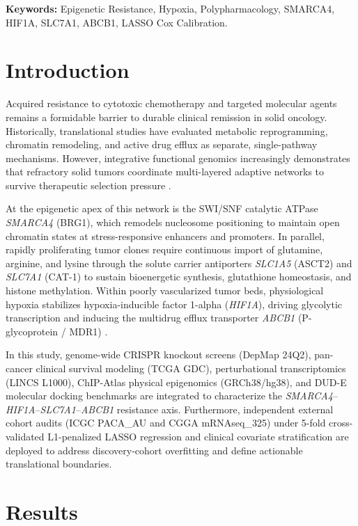 \documentclass[11pt,a4paper]{article}
\begin{document}
\noindent \textbf{Keywords:} Epigenetic Resistance, Hypoxia, Polypharmacology, SMARCA4, HIF1A, SLC7A1, ABCB1, LASSO Cox Calibration.

\newpage

\section{Introduction}
Acquired resistance to cytotoxic chemotherapy and targeted molecular agents remains a formidable barrier to durable clinical remission in solid oncology. Historically, translational studies have evaluated metabolic reprogramming, chromatin remodeling, and active drug efflux as separate, single-pathway mechanisms. However, integrative functional genomics increasingly demonstrates that refractory solid tumors coordinate multi-layered adaptive networks to survive therapeutic selection pressure \cite{depmap2024,tcga2018}.

At the epigenetic apex of this network is the SWI/SNF catalytic ATPase \textit{SMARCA4} (BRG1), which remodels nucleosome positioning to maintain open chromatin states at stress-responsive enhancers and promoters. In parallel, rapidly proliferating tumor clones require continuous import of glutamine, arginine, and lysine through the solute carrier antiporters \textit{SLC1A5} (ASCT2) and \textit{SLC7A1} (CAT-1) to sustain bioenergetic synthesis, glutathione homeostasis, and histone methylation. Within poorly vascularized tumor beds, physiological hypoxia stabilizes hypoxia-inducible factor 1-alpha (\textit{HIF1A}), driving glycolytic transcription and inducing the multidrug efflux transporter \textit{ABCB1} (P-glycoprotein / MDR1) \cite{subramanian2017}.

In this study, genome-wide CRISPR knockout screens (DepMap 24Q2), pan-cancer clinical survival modeling (TCGA GDC), perturbational transcriptomics (LINCS L1000), ChIP-Atlas physical epigenomics (GRCh38/hg38), and DUD-E molecular docking benchmarks are integrated to characterize the \textit{SMARCA4}--\textit{HIF1A}--\textit{SLC7A1}--\textit{ABCB1} resistance axis. Furthermore, independent external cohort audits (ICGC PACA\_AU and CGGA mRNAseq\_325) under 5-fold cross-validated L1-penalized LASSO regression and clinical covariate stratification are deployed to address discovery-cohort overfitting and define actionable translational boundaries.

\section{Results}
\end{document}
